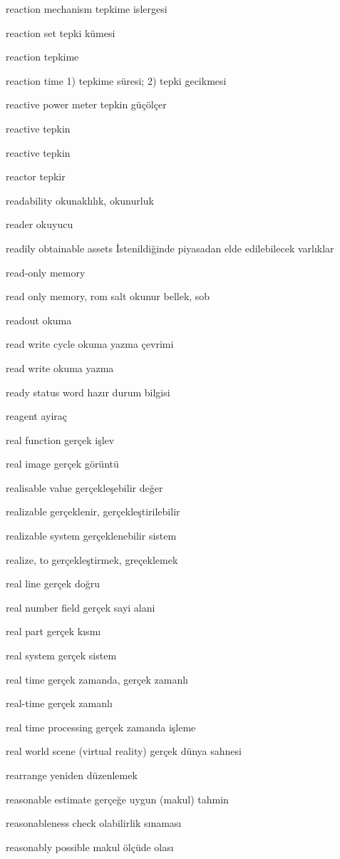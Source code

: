 \documentclass[12pt,fleqn]{article}\usepackage{../../common}
\begin{document}
reaction mechanism tepkime islergesi

reaction set tepki kümesi

reaction tepkime

reaction time 1) tepkime süresi; 2) tepki gecikmesi

reactive power meter tepkin güçölçer

reactive tepkin

reactive tepkin

reactor tepkir

readability okunaklılık, okunurluk

reader okuyucu

readily obtainable assets İstenildiğinde piyasadan elde edilebilecek varlıklar

read-only memory

read only memory, rom salt okunur bellek, sob

readout okuma

read write cycle okuma yazma çevrimi

read write okuma yazma

ready status word hazır durum bilgisi

reagent ayiraç

real function gerçek işlev

real image gerçek görüntü

realisable value gerçekleşebilir değer

realizable gerçeklenir, gerçekleştirilebilir

realizable system gerçeklenebilir sistem

realize, to gerçekleştirmek, greçeklemek

real line gerçek doğru

real number field gerçek sayi alani

real part gerçek kısmı

real system gerçek sistem

real time gerçek zamanda, gerçek zamanlı

real-time gerçek zamanlı

real time processing gerçek zamanda işleme

real world scene (virtual reality) gerçek dünya sahnesi

rearrange yeniden düzenlemek

reasonable estimate gerçeğe uygun (makul) tahmin

reasonableness check olabilirlik sınaması

reasonably possible makul ölçüde olası
\end{document}
